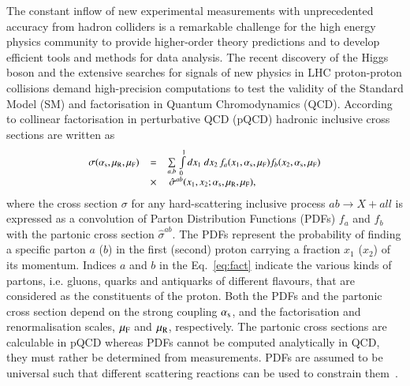 The constant inflow of new experimental measurements 
with unprecedented accuracy from hadron colliders is a remarkable challenge 
for the high energy physics community to provide higher-order theory 
predictions and to develop efficient tools and methods for data analysis.
The recent discovery of the Higgs boson \cite{Aad:2012tfa,Chatrchyan:2012ufa} 
and the extensive searches
for signals of new physics in LHC proton-proton collisions
demand high-precision computations to test the validity of the Standard Model (SM)
and factorisation in Quantum Chromodynamics (QCD).
According to collinear factorisation in perturbative QCD (pQCD)
hadronic inclusive cross sections are written as
%
\begin{equation}
\small
\begin{array}{lcl}
\sigma(\alpha_\mathrm{s},\mu_\mathrm{R},\mu_\mathrm{F}) & = &
\sum\limits_{a,b}\,  \int\limits_{0}\limits^{1} dx_1\ dx_2\, f_a(x_1,\alpha_\mathrm{s},\mu_\mathrm{F}) 
 f_b(x_2,\alpha_\mathrm{s},\mu_\mathrm{F})\\ 
& \times & \, \hat{\sigma}^{ab}(x_1,x_2;\alpha_\mathrm{s},\mu_\mathrm{R},\mu_\mathrm{F}),
\label{eq:fact}
\end{array}
\end{equation}
where the cross section $\sigma$ for 
any hard-scattering inclusive process $ab \rightarrow X + all$
is expressed
as a convolution of Parton Distribution Functions (PDFs) $f_a$ and $f_b$
with the partonic cross section
$\hat{\sigma}^{ab}$.
%
The PDFs represent 
the probability of finding a specific parton $a$ ($b$) in the first (second) proton carrying a fraction $x_1$ ($x_2$) of its momentum.
%
Indices $a$ and $b$ in the Eq.~\ref{eq:fact} indicate the various 
kinds of partons,
i.e. gluons, quarks and antiquarks of different flavours, 
that are considered
as the constituents of the proton.
%
Both the PDFs and the partonic cross section depend on the strong coupling
$\alpha_\mathrm{s}$, and the factorisation and renormalisation scales,
$\mu_\mathrm{F}$ and $\mu_\mathrm{R}$, respectively.
%
The partonic cross sections are calculable in pQCD whereas
PDFs cannot be computed analytically in QCD,
they must rather be determined from measurements. 
%
PDFs are assumed to be universal such that different scattering reactions can be used 
to constrain them~\cite{Perez:2012um,Forte:2013wc}.
%

